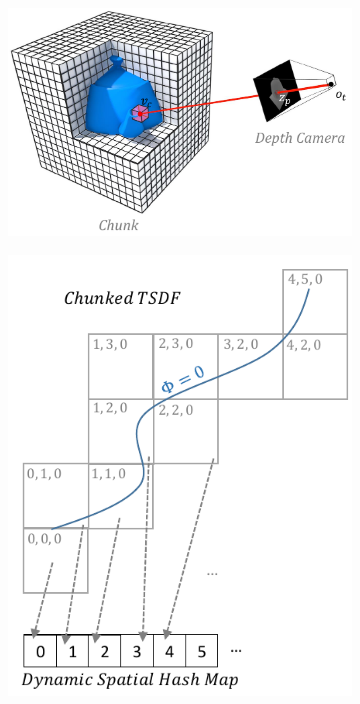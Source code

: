 \documentclass[10pt,twocolumn,letterpaper]{article}
\begin{document}
\begin{figure}
\begin{minipage}{0.25\linewidth}
\begin{subfigure}{\linewidth}
	    \includegraphics[width=1.0\textwidth]{img/projection_mapping}
	      \caption{} 
	      \label{fig:projection_mapping}
	  \end{subfigure} 
\end{minipage}
     \begin{minipage}{0.23\linewidth}
 	  	\begin{subfigure}{\linewidth} \centering
 	    \includegraphics[width=1.0\textwidth]{img/chunks.pdf}

\end{subfigure}
\end{minipage}
\end{figure}
\end{document}
